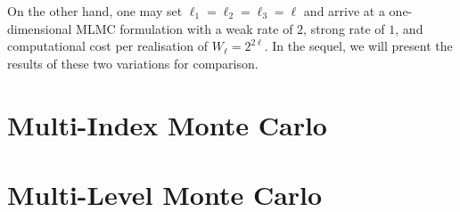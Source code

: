 \documentclass[11pt]{amsart}
\begin{document}
On the other hand, one may set $\ell_1=\ell_2=\ell_3=\ell$
and arrive at a one-dimensional MLMC formulation with a weak rate of $2$, strong rate of $1$, and computational cost per realisation of $W_\ell=2^{2\ell}$. In the sequel, we will present the results of these two variations for comparison.

\section{Multi-Index Monte Carlo}



\section{Multi-Level Monte Carlo}





\appendix
\end{document}
